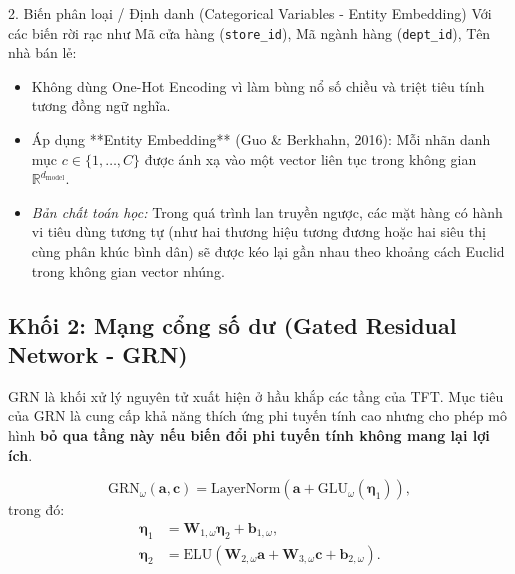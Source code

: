 \documentclass[12pt,a4paper,oneside]{article}
\begin{document}
\begin{conceptbox}{2. Biến phân loại / Định danh (Categorical Variables - Entity Embedding)}
    Với các biến rời rạc như Mã cửa hàng (\texttt{store\_id}), Mã ngành hàng (\texttt{dept\_id}), Tên nhà bán lẻ:
    \begin{itemize}
        \item Không dùng One-Hot Encoding vì làm bùng nổ số chiều và triệt tiêu tính tương đồng ngữ nghĩa.
        \item Áp dụng **Entity Embedding** (Guo \& Berkhahn, 2016): Mỗi nhãn danh mục $c \in \{1, \dots, C\}$ được ánh xạ vào một vector liên tục trong không gian $\mathbb{R}^{d_{\text{model}}}$.
        \item \textit{Bản chất toán học:} Trong quá trình lan truyền ngược, các mặt hàng có hành vi tiêu dùng tương tự (như hai thương hiệu tương đương hoặc hai siêu thị cùng phân khúc bình dân) sẽ được kéo lại gần nhau theo khoảng cách Euclid trong không gian vector nhúng.
    \end{itemize}
\end{conceptbox}

\subsection{Khối 2: Mạng cổng số dư (Gated Residual Network - GRN)}
\label{subsec:grn}

GRN là khối xử lý nguyên tử xuất hiện ở hầu khắp các tầng của TFT. Mục tiêu của GRN là cung cấp khả năng thích ứng phi tuyến tính cao nhưng cho phép mô hình \textbf{bỏ qua tầng này nếu biến đổi phi tuyến tính không mang lại lợi ích}.

\begin{equation}
    \text{GRN}_{\omega}(\mathbf{a}, \mathbf{c}) = \text{LayerNorm}\!\left(\mathbf{a} + \text{GLU}_{\omega}\!\left(\bm{\eta}_1\right)\right),
    \label{eq:grn_main}
\end{equation}
trong đó:
\begin{align}
    \bm{\eta}_1 &= \mathbf{W}_{1,\omega} \bm{\eta}_2 + \mathbf{b}_{1,\omega}, \label{eq:grn_eta1} \\
    \bm{\eta}_2 &= \text{ELU}\!\left(\mathbf{W}_{2,\omega} \mathbf{a} + \mathbf{W}_{3,\omega} \mathbf{c} + \mathbf{b}_{2,\omega}\right). \label{eq:grn_eta2}
\end{align}
\end{document}
